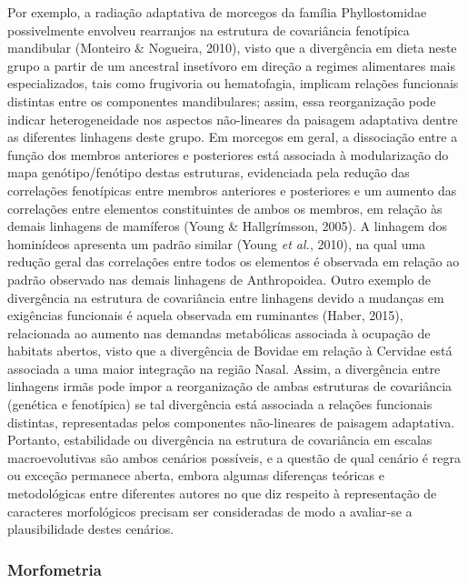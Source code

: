 \documentclass[12pt,twoside]{report}
\begin{document}
Por exemplo, a radiação adaptativa de morcegos da família Phyllostomidae
possivelmente envolveu rearranjos na estrutura de covariância fenotípica
mandibular (Monteiro \& Nogueira, 2010), visto que a divergência em
dieta neste grupo a partir de um ancestral insetívoro em direção a
regimes alimentares mais especializados, tais como frugivoria ou
hematofagia, implicam relações funcionais distintas entre os componentes
mandibulares; assim, essa reorganização pode indicar heterogeneidade nos
aspectos não-lineares da paisagem adaptativa dentre as diferentes
linhagens deste grupo. Em morcegos em geral, a dissociação entre a
função dos membros anteriores e posteriores está associada à
modularização do mapa genótipo/fenótipo destas estruturas, evidenciada
pela redução das correlações fenotípicas entre membros anteriores e
posteriores e um aumento das correlações entre elementos constituintes
de ambos os membros, em relação às demais linhagens de mamíferos (Young
\& Hallgrímsson, 2005). A linhagem dos hominídeos apresenta um padrão
similar (Young \emph{et al.}, 2010), na qual uma redução geral das
correlações entre todos os elementos é observada em relação ao padrão
observado nas demais linhagens de Anthropoidea. Outro exemplo de
divergência na estrutura de covariância entre linhagens devido a
mudanças em exigências funcionais é aquela observada em ruminantes
(Haber, 2015), relacionada ao aumento nas demandas metabólicas associada
à ocupação de habitats abertos, visto que a divergência de Bovidae em
relação à Cervidae está associada a uma maior integração na região
Nasal. Assim, a divergência entre linhagens irmãs pode impor a
reorganização de ambas estruturas de covariância (genética e fenotípica)
se tal divergência está associada a relações funcionais distintas,
representadas pelos componentes não-lineares de paisagem adaptativa.
Portanto, estabilidade ou divergência na estrutura de covariância em
escalas macroevolutivas são ambos cenários possíveis, e a questão de
qual cenário é regra ou exceção permanece aberta, embora algumas
diferenças teóricas e metodológicas entre diferentes autores no que diz
respeito à representação de caracteres morfológicos precisam ser
consideradas de modo a avaliar-se a plausibilidade destes cenários.

\subsubsection{Morfometria}\label{morfometria}
\end{document}
